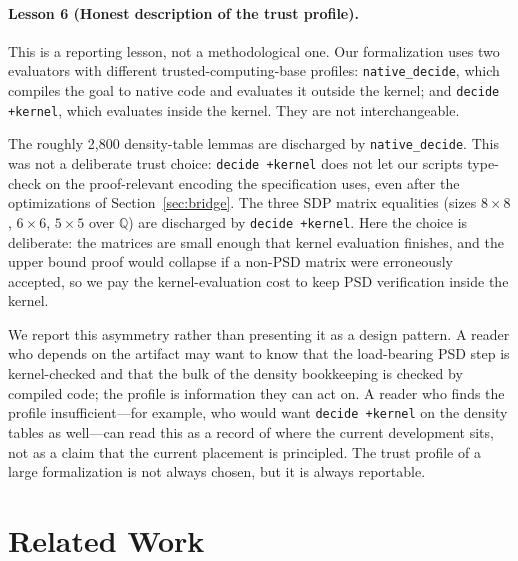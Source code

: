 \documentclass{article}
\newcommand{\lean}[1]{\texttt{#1}}
\begin{document}
\paragraph{Lesson 6 (Honest description of the trust profile).}
This is a reporting lesson, not a methodological one.  Our formalization
uses two evaluators with different trusted-computing-base profiles:
\lean{native\_decide}, which compiles the goal to native code and evaluates
it outside the kernel; and \lean{decide +kernel}, which evaluates inside the
kernel.  They are not interchangeable.

The roughly 2,800 density-table lemmas are discharged by
\lean{native\_decide}.  This was not a deliberate trust choice:
\lean{decide +kernel} does not let our scripts type-check on the
proof-relevant encoding the specification uses, even after the optimizations
of Section~\ref{sec:bridge}.  The three SDP matrix equalities (sizes
$8 \times 8$, $6 \times 6$, $5 \times 5$ over $\mathbb{Q}$) are discharged
by \lean{decide +kernel}.  Here the choice is deliberate: the matrices are
small enough that kernel evaluation finishes, and the upper bound proof
would collapse if a non-PSD matrix were erroneously accepted, so we pay the
kernel-evaluation cost to keep PSD verification inside the kernel.

We report this asymmetry rather than presenting it as a design pattern.  A
reader who depends on the artifact may want to know that the load-bearing
PSD step is kernel-checked and that the bulk of the density bookkeeping is
checked by compiled code; the profile is information they can act on.  A
reader who finds the profile insufficient---for example, who would want
\lean{decide +kernel} on the density tables as well---can read this as a
record of where the current development sits, not as a claim that the
current placement is principled.  The trust profile of a large formalization
is not always chosen, but it is always reportable.


\section{Related Work}
\label{sec:related}
\end{document}
